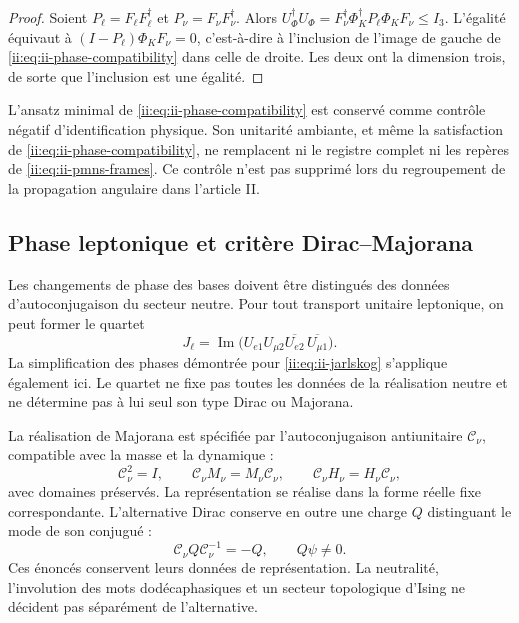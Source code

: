 \begin{proof}
Soient \(P_\ell=F_\ell F_\ell^\dagger\) et
\(P_\nu=F_\nu F_\nu^\dagger\). Alors
\(U_\Phi^\dagger U_\Phi
=F_\nu^\dagger\Phi_K^\dagger P_\ell\Phi_KF_\nu\le I_3\).
L'égalité équivaut à
\((I-P_\ell)\Phi_KF_\nu=0\), c'est-à-dire à l'inclusion de
l'image de gauche de \eqref{ii:eq:ii-phase-compatibility} dans celle de droite.
Les deux ont la dimension trois, de sorte que l'inclusion est une égalité.
\end{proof}

L’ansatz minimal de \eqref{ii:eq:ii-phase-compatibility} est conservé comme contrôle négatif d’identification physique. Son unitarité ambiante, et même la satisfaction de \eqref{ii:eq:ii-phase-compatibility}, ne remplacent ni le registre complet ni les repères de \eqref{ii:eq:ii-pmns-frames}. Ce contrôle n’est pas supprimé lors du regroupement de la propagation angulaire dans l’article II.

\subsection{Phase leptonique et critère Dirac--Majorana}

Les changements de phase des bases doivent être distingués des données
d'autoconjugaison du secteur neutre. Pour tout transport unitaire
leptonique, on peut former le quartet
\begin{equation}
 J_\ell=\operatorname{Im}
 \bigl(U_{e1}U_{\mu2}\overline{U_{e2}}\,
                        \overline{U_{\mu1}}\bigr).
 \label{ii:eq:ii-leptonic-quartet}
\end{equation}
La simplification des phases démontrée pour \eqref{ii:eq:ii-jarlskog}
s'applique également ici. Le quartet ne fixe pas toutes les données de la
réalisation neutre et ne détermine pas à lui seul son type Dirac ou Majorana.

La réalisation de Majorana est spécifiée par
l'autoconjugaison antiunitaire \(\mathcal C_\nu\), compatible avec la masse et la
dynamique :
\begin{equation}
 \mathcal C_\nu^2=I,\qquad
 \mathcal C_\nu M_\nu=M_\nu\mathcal C_\nu,\qquad
 \mathcal C_\nu H_\nu=H_\nu\mathcal C_\nu,
 \label{ii:eq:ii-majorana-compatibility}
\end{equation}
avec domaines préservés. La représentation se réalise dans la forme réelle
fixe correspondante. L'alternative Dirac conserve en outre une charge
\(Q\) distinguant le mode de son conjugué :
\begin{equation}
 \mathcal C_\nu Q\mathcal C_\nu^{-1}=-Q,\qquad Q\psi\ne0.
 \label{ii:eq:ii-dirac-charge}
\end{equation}
Ces énoncés conservent leurs données de représentation. La neutralité,
l'involution des mots dodécaphasiques et un secteur topologique d'Ising
ne décident pas séparément de l'alternative.


